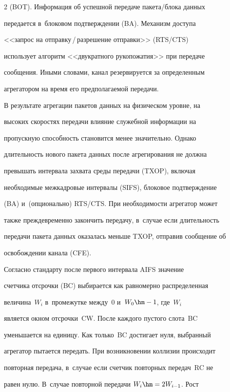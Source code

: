 \begin{multicols}{2}
(BOT). Информация об успешной передаче пакета/блока данных 


передается в~блоковом под\-тверж\-де\-нии (BA). Механизм доступа 


<<запрос на от\-прав\-ку\,/\,раз\-ре\-ше\-ние отправки>> (RTS/CTS) 


использует алгоритм <<двукратного рукопожатия>> при передаче 


сообщения. Иными словами, канал резервируется за определенным 


агрегатором на время его предполагаемой передачи.


    


    В результате агрегации пакетов данных на физическом уровне, на 


высоких скоростях передачи влияние служебной информации на 


пропускную способность становится менее значительно. Однако 


длительность нового пакета данных после агрегирования не должна 


превышать интервала захва\-та среды передачи (TXOP), включая 


необходимые межкадровые интервалы (SIFS), блоковое под\-тверж\-де\-ние 


(BA) и~(опционально) RTS/CTS. При не\-об\-хо\-ди\-мости агрегатор может 


также преждевременно закончить передачу, в~случае если длительность 


передачи пакета данных оказалась меньше TXOP, отправив сообщение об 


освобождении канала (CFE).


    


    Согласно стандарту после первого интервала AIFS значение 


счетчика отсрочки (BC) выбирается как равномерно распределенная 


величина~$W_i$ в~промежутке между~0 и~$W_0\hm-1$, где~$W_i$ 


является окном отсрочки~CW. После каждого пустого слота~BC 


уменьшается на единицу. Как только~BC достигает нуля, выбранный 


агрегатор пытается передать. При возникновении коллизии происходит 


повторная передача, в~случае если счетчик повторных передач~RC не 


равен нулю. В~случае повторной передачи $W_i\hm= 2W_{i-1}$. Рост 



\end{multicols}
